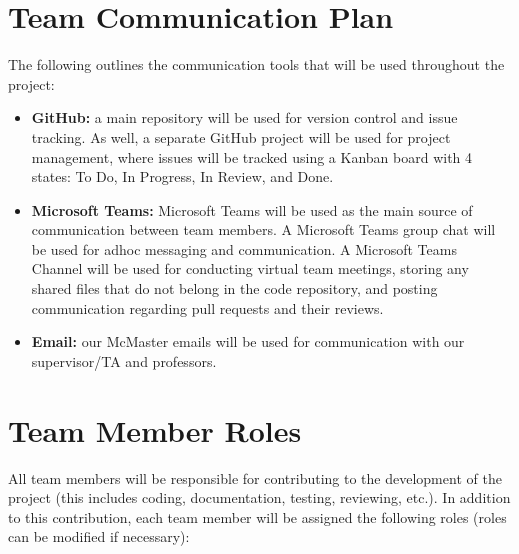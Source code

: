 \documentclass{article}
\begin{document}


\section{Team Communication Plan}

The following outlines the communication tools that will be used throughout the 
project:

\begin{itemize}
	\item \textbf{GitHub:} a main repository will be used for version control and 
  issue tracking. As well, a separate GitHub project will be used for project 
  management, where issues will be tracked using a Kanban board with 4 states: 
  To Do, In Progress, In Review, and Done.
	\item \textbf{Microsoft Teams:} Microsoft Teams will be used as the main source 
	of communication between team members. A Microsoft Teams group chat will be 
  used for adhoc messaging and communication. A Microsoft Teams Channel will be 
  used for conducting virtual team meetings, storing any shared files that do not 
  belong in the code repository, and posting communication regarding pull requests 
  and their reviews.
  \item \textbf{Email:} our McMaster emails will be used for communication with our 
  supervisor/TA and professors.
\end{itemize}


\section{Team Member Roles}

All team members will be responsible for contributing to the development of the project 
(this includes coding, documentation, testing, reviewing, etc.). In addition to 
this contribution, each team member will be assigned the following roles (roles can 
be modified if necessary): 
\end{document}
